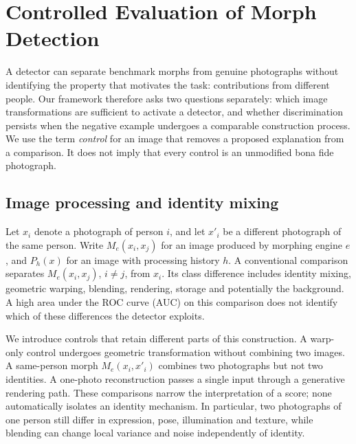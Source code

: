 \section{Controlled Evaluation of Morph Detection}
\label{sec:controls}

A detector can separate benchmark morphs from genuine photographs without identifying the property that motivates the task: contributions from different people. Our framework therefore asks two questions separately: which image transformations are sufficient to activate a detector, and whether discrimination persists when the negative example undergoes a comparable construction process. We use the term \emph{control} for an image that removes a proposed explanation from a comparison. It does not imply that every control is an unmodified bona fide photograph.

\subsection{Image processing and identity mixing}
Let $x_i$ denote a photograph of person $i$, and let $x'_i$ be a different photograph of the same person. Write $M_e(x_i,x_j)$ for an image produced by morphing engine $e$, and $P_h(x)$ for an image with processing history $h$. A conventional comparison separates $M_e(x_i,x_j)$, $i\ne j$, from $x_i$. Its class difference includes identity mixing, geometric warping, blending, rendering, storage and potentially the background. A high area under the ROC curve (AUC) on this comparison does not identify which of these differences the detector exploits.

We introduce controls that retain different parts of this construction. A warp-only control undergoes geometric transformation without combining two images. A same-person morph $M_e(x_i,x'_i)$ combines two photographs but not two identities. A one-photo reconstruction passes a single input through a generative rendering path. These comparisons narrow the interpretation of a score; none automatically isolates an identity mechanism. In particular, two photographs of one person still differ in expression, pose, illumination and texture, while blending can change local variance and noise independently of identity.

